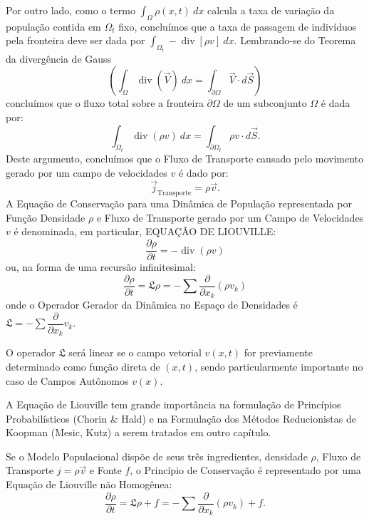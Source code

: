 Por outro lado, como o termo \(\int_{\Omega} \rho(x,t)\ dx\) calcula a taxa de variação da população contida em \(\Omega_t\) fixo, concluímos que a taxa de passagem de indivíduos pela fronteira deve ser dada por \(\int_{\Omega_t} -\operatorname{div}[\rho v]\ dx\). Lembrando-se do Teorema da divergência de Gauss
\[\left(\int_{\Omega} \operatorname{div}(\vec{V})\ dx = \int_{\partial\Omega} \vec{V} \cdot d\vec{S}\right)\]
concluímos que o fluxo total sobre a fronteira \(\partial \Omega\) de um subconjunto \(\Omega\) é dada por:
\[\int_{\Omega_t} \operatorname{div}(\rho v)\ dx = \int_{\partial\Omega_t} \rho v \cdot d\vec{S}.\]
Deste argumento, concluímos que o Fluxo de Transporte causado pelo movimento gerado por um campo de velocidades \(v\) é dado por:
\begin{equation}
\vec{j}_{\mbox{Transporte}} = \rho \vec{v}.
\end{equation}
A Equação de Conservação para uma Dinâmica de População representada por Função Densidade \(\rho\) e Fluxo de Transporte gerado por um Campo de Velocidades \(v\) é denominada, em particular, EQUAÇÃO DE LIOUVILLE:
\begin{equation}
\dfrac{\partial \rho}{\partial t} = -\operatorname{div}(\rho v)
\end{equation}
ou, na forma de uma recursão infinitesimal:
\begin{equation}
\dfrac{\partial \rho}{\partial t} = \mathfrak{L} \rho = -\sum \dfrac{\partial}{\partial x_k}(\rho v_k)
\end{equation}
onde o Operador Gerador da Dinâmica no Espaço de Densidades é \(\mathfrak{L} = -\sum \dfrac{\partial}{\partial x_k} v_k\).

O operador \(\mathfrak{L}\) será linear se o campo vetorial \(v(x,t)\) for previamente determinado como função direta de \((x,t)\), sendo particularmente importante no caso de Campos Autônomos \(v(x)\).

A Equação de Liouville tem grande importância na formulação de Princípios Probabilísticos (Chorin \& Hald) e na Formulação dos Métodos Reducionistas de Koopman (Mesic, Kutz) a serem tratados em outro capítulo.

Se o Modelo Populacional dispõe de seus três ingredientes, densidade \(\rho\), Fluxo de Transporte \(j = \rho \vec{v}\) e Fonte \(f\), o Princípio de Conservação é representado por uma Equação de Liouville não Homogênea:
\begin{equation}
\dfrac{\partial \rho}{\partial t} = \mathfrak{L} \rho + f = -\sum \dfrac{\partial}{\partial x_k}(\rho v_k) + f.
\end{equation}


